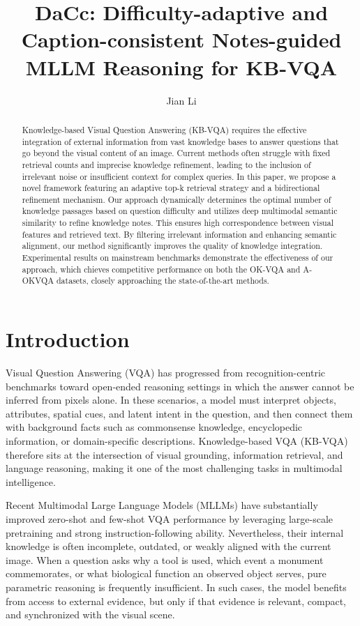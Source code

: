 \documentclass[manuscript,screen,review]{acmart}
\title{DaCc: Difficulty-adaptive and Caption-consistent Notes-guided MLLM Reasoning for KB-VQA}
\author{Jian Li}
\affiliation{
  \institution{School of Computer Science and Engineering, Macau University of Science and Technology}
  \city{Macau}
  \country{China}}
\begin{document}
\begin{abstract}
Knowledge-based Visual Question Answering (KB-VQA) requires the effective integration of external information from vast knowledge bases to answer questions that go beyond the visual content of an image. Current methods often struggle with fixed retrieval counts and imprecise knowledge refinement, leading to the inclusion of irrelevant noise or insufficient context for complex queries. In this paper, we propose a novel framework featuring an adaptive top-k retrieval strategy and a bidirectional refinement mechanism. Our approach dynamically determines the optimal number of knowledge passages based on question difficulty and utilizes deep multimodal semantic similarity to refine knowledge notes. This ensures high correspondence between visual features and retrieved text. By filtering irrelevant information and enhancing semantic alignment, our method significantly improves the quality of knowledge integration. Experimental results on mainstream benchmarks demonstrate the effectiveness of our approach, which chieves competitive performance on both the OK-VQA and A-OKVQA datasets, closely approaching the state-of-the-art methods.
\end{abstract}


\maketitle

\section{Introduction}

Visual Question Answering (VQA) has progressed from recognition-centric benchmarks toward open-ended reasoning settings in which the answer cannot be inferred from pixels alone. In these scenarios, a model must interpret objects, attributes, spatial cues, and latent intent in the question, and then connect them with background facts such as commonsense knowledge, encyclopedic information, or domain-specific descriptions. Knowledge-based VQA (KB-VQA) therefore sits at the intersection of visual grounding, information retrieval, and language reasoning, making it one of the most challenging tasks in multimodal intelligence.

Recent Multimodal Large Language Models (MLLMs) have substantially improved zero-shot and few-shot VQA performance by leveraging large-scale pretraining and strong instruction-following ability. Nevertheless, their internal knowledge is often incomplete, outdated, or weakly aligned with the current image. When a question asks why a tool is used, which event a monument commemorates, or what biological function an observed object serves, pure parametric reasoning is frequently insufficient. In such cases, the model benefits from access to external evidence, but only if that evidence is relevant, compact, and synchronized with the visual scene.
\end{document}
